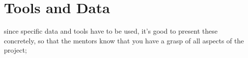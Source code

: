 \chapter{Tools and Data}
\label{chap:TD}

since specific data and tools have to be used, it’s good to present these concretely, so that the mentors know that you have a grasp of all aspects of the project;